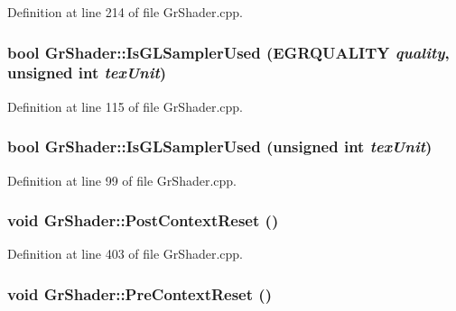 \begin{CompactItemize}
Definition at line 214 of file GrShader.cpp.\hypertarget{class_gr_shader_64b1416ca1fd91ff9da4a37bbbf5bb0e}{
\subsubsection[{IsGLSamplerUsed}]{\setlength{\rightskip}{0pt plus 5cm}bool GrShader::IsGLSamplerUsed ({\bf EGRQUALITY} {\em quality}, \/  unsigned int {\em texUnit})}}
\label{class_gr_shader_64b1416ca1fd91ff9da4a37bbbf5bb0e}




Definition at line 115 of file GrShader.cpp.\hypertarget{class_gr_shader_e40cd62323e0186bd30977b00617516e}{
\subsubsection[{IsGLSamplerUsed}]{\setlength{\rightskip}{0pt plus 5cm}bool GrShader::IsGLSamplerUsed (unsigned int {\em texUnit})}}
\label{class_gr_shader_e40cd62323e0186bd30977b00617516e}




Definition at line 99 of file GrShader.cpp.\hypertarget{class_gr_shader_5a508bd00cf8c3536028294bc8f6badc}{
\subsubsection[{PostContextReset}]{\setlength{\rightskip}{0pt plus 5cm}void GrShader::PostContextReset ()}}
\label{class_gr_shader_5a508bd00cf8c3536028294bc8f6badc}




Definition at line 403 of file GrShader.cpp.\hypertarget{class_gr_shader_2e574044a7d47d0a07d49a8a6f82fe06}{
\subsubsection[{PreContextReset}]{\setlength{\rightskip}{0pt plus 5cm}void GrShader::PreContextReset ()}}
\label{class_gr_shader_2e574044a7d47d0a07d49a8a6f82fe06}





\end{CompactItemize}
